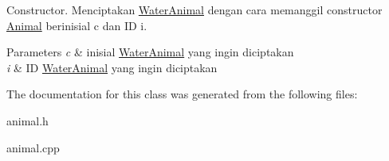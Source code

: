 Constructor. Menciptakan \hyperlink{classWaterAnimal}{Water\+Animal} dengan cara memanggil constructor \hyperlink{classAnimal}{Animal} berinisial c dan ID i. 


\begin{DoxyParams}{Parameters}
{\em c} & inisial \hyperlink{classWaterAnimal}{Water\+Animal} yang ingin diciptakan \\
\hline
{\em i} & ID \hyperlink{classWaterAnimal}{Water\+Animal} yang ingin diciptakan \\
\hline
\end{DoxyParams}


The documentation for this class was generated from the following files\+:\begin{DoxyCompactItemize}
\item 
animal.\+h\item 
animal.\+cpp\end{DoxyCompactItemize}
